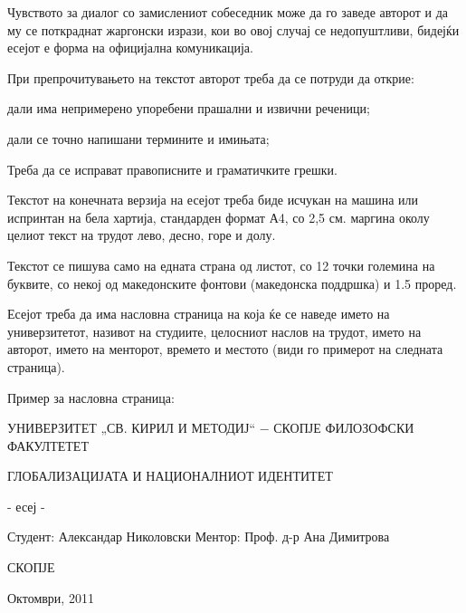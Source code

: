 \documentclass[12pt,a4paper]{article}
\begin{document}
Чувството за диалог со замислениот собеседник може да го заведе авторот и да му
се пот­краднат жаргонски изрази, кои во овој случај се недопушт­ливи, бидејќи
есејот е форма на официјална комуникација.

При препрочитувањето на текстот авторот треба да се потруди да открие:
 
дали има непримерено упоребени прашални и извични реченици;
 
        дали се точно напишани термините и имињата;

Треба да се исправат правописните и граматичките грешки.

Текстот на конечната верзија на есејот треба биде исчукан на машина или
испринтан на бела хартија, стандарден фор­мат А4, со 2,5 см. маргина околу
целиот текст на трудот ­лево, десно, горе и долу.

Текстот се пишува само на едната страна од листот, со 12 точки големина на
буквите, со некој од македонските фон­тови (македонска поддршка) и 1.5 проред.

Есејот треба да има насловна страница на која ќе се наведе името на
универзитетот, називот на студиите, целосниот нас­лов на трудот, името на
авторот, името на менторот, време­то и местото (види го примерот на следната
страница).

Пример за насловна страница: 

УНИВЕРЗИТЕТ „СВ. КИРИЛ И МЕТОДИЈ“ − СКОПЈЕ
ФИЛОЗОФСКИ ФАКУЛТЕТЕТ

ГЛОБАЛИЗАЦИЈАТА И НАЦИОНАЛНИОТ ИДЕНТИТЕТ 

- есеј - 

Студент: Александар Николовски
                                       Ментор:  Проф. д-р Ана Димитрова



СКОПЈЕ

Октомври, 2011
\end{document}
